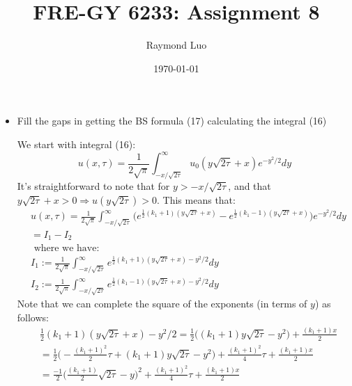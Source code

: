 \documentclass[12pt,twoside, letter]{exam}
\theoremstyle{definition}
\begin{document}
\abovedisplayskip=12pt
\belowdisplayskip=12pt
\abovedisplayshortskip=7pt
\belowdisplayshortskip=10pt
\allowdisplaybreaks

\setlength{\parindent}{18pt}

\title{FRE-GY 6233: Assignment 8}
\author{Raymond Luo}
\date{\today}
\maketitle

  \begin{itemize}
    \item Fill the gaps in getting the BS formula (17) calculating the integral (16)

      \begin{solution}
        We start with integral (16):
        \begin{equation*}
          u(x,\tau) = \frac{1}{2\sqrt{\pi}}\int^{\infty}_{-x/\sqrt{2\tau}} u_0(y\sqrt{2\tau}+x)e^{-y^2/2}dy
        \end{equation*}
        It's straightforward to note that for $y > -x/\sqrt{2\tau}$,
        and that $y\sqrt{2\tau} + x > 0 \Rightarrow u(y\sqrt{2\tau}) > 0$. This means that:
        \begin{align*}
          &u(x,\tau) = \frac{1}{2\sqrt{\pi}}\int^{\infty}_{-x/\sqrt{2\tau}} \bigg(e^{\frac{1}{2}(k_1 + 1)(y\sqrt{2\tau}+x)} - e^{\frac{1}{2}(k_1 - 1)(y\sqrt{2\tau}+x)} \bigg)e^{-y^2/2}dy \\
          &= I_1 - I_2 \\
          &\text{ where we have:}\\
          & I_1 := \frac{1}{2\sqrt{\pi}}\int^{\infty}_{-x/\sqrt{2\tau}} e^{\frac{1}{2}(k_1 + 1)(y\sqrt{2\tau}+x) - y^2/2} dy \\
          & I_2 := \frac{1}{2\sqrt{\pi}}\int^{\infty}_{-x/\sqrt{2\tau}} e^{\frac{1}{2}(k_1 - 1)(y\sqrt{2\tau}+x) - y^2/2} dy
        \end{align*}
        Note that we can complete the square of the exponents (in terms of $y$) as follows:
        \begin{align*}
          &\frac{1}{2}(k_1 + 1)(y\sqrt{2\tau}+x) - y^2/2 = \frac{1}{2}\bigg((k_1 + 1)y\sqrt{2\tau} - y^2\bigg) + \frac{(k_1 + 1)x}{2} \\
          &= \frac{1}{2}\bigg(-\frac{(k_1+1)^2}{2}\tau + (k_1 + 1)y\sqrt{2\tau} - y^2\bigg) + \frac{(k_1+1)^2}{4}\tau + \frac{(k_1 + 1)x}{2} \\
          &= \frac{-1}{2}\bigg(\frac{(k_1 + 1)}{2}\sqrt{2\tau} - y \bigg)^2 + \frac{(k_1+1)^2}{4}\tau + \frac{(k_1 + 1)x}{2}

\end{align*}
\end{solution}
\end{itemize}
\end{document}
